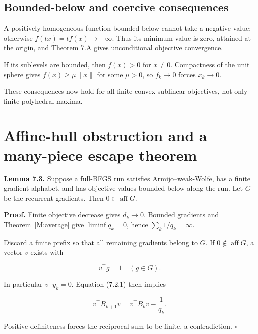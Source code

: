 

\subsection{Bounded-below and coercive
consequences}\label{H:bounded-below-and-coercive-consequences}


A positively homogeneous function bounded below cannot take a negative
value: otherwise \(f(tx)=tf(x)\to-\infty\). Thus its minimum value is
zero, attained at the origin, and Theorem 7.A gives unconditional
objective convergence.

If its sublevels are bounded, then \(f(x)>0\) for \(x\ne0\). Compactness
of the unit sphere gives \(f(x)\ge\mu\|x\|\) for some \(\mu>0\), so
\(f_k\to0\) forces \(x_k\to0\).

These consequences now hold for all finite convex sublinear objectives,
not only finite polyhedral maxima.


\setcounter{section}{5}
\setcounter{theorem}{0}
\setcounter{lemma}{0}
\setcounter{corollary}{0}
\setcounter{proposition}{0}
\setcounter{remark}{0}
\setcounter{equation}{0}


\section{Affine-hull obstruction and a many-piece escape
theorem}\label{H:affine-hull-obstruction-and-a-many-piece-escape-theorem}

\textbf{Lemma 7.3.} Suppose a full-BFGS run satisfies Armijo--weak-Wolfe,
has a finite gradient alphabet, and has objective values bounded below
along the run. Let \(G\) be the recurrent gradients. Then
\(0\in\operatorname{aff}G\).

\textbf{Proof.} Finite objective decrease gives \(d_k\to0\). Bounded
gradients and Theorem~\ref{M:average} give \(\liminf q_k=0\), hence
\(\sum_k1/q_k=\infty\).

Discard a finite prefix so that all remaining gradients belong to \(G\).
If \(0\notin\operatorname{aff}G\), a vector \(v\) exists with

\[
v^\top g=1\quad(g\in G).
\]

In particular \(v^\top y_k=0\). Equation (7.2.1) then implies

\[
v^\top B_{k+1}v=v^\top B_kv-\frac1{q_k}.
\]

Positive definiteness forces the reciprocal sum to be finite, a
contradiction. \(\square\)

